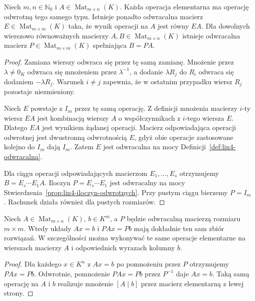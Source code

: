 \begin{stwierdzenie}
\label{prop:lin5-odwracalne-operacje}
Niech \(m,n\in\mathbb N_0\) i
\(A\in\operatorname{Mat}_{m\times n}(K)\).
Każda operacja elementarna ma operację odwrotną
tego samego typu. Istnieje ponadto
odwracalna macierz \(E\in\operatorname{Mat}_{m\times m}(K)\)
taka, że wynik operacji na \(A\) jest równy \(EA\).
Dla dowolnych wierszowo równoważnych macierzy
\(A,B\in\operatorname{Mat}_{m\times n}(K)\)
istnieje odwracalna macierz
\(P\in\operatorname{Mat}_{m\times m}(K)\)
spełniająca \(B=PA\).
\end{stwierdzenie}
\begin{proof}
Zamiana wierszy odwraca się przez tę samą zamianę.
Mnożenie przez \(\lambda\ne0_K\) odwraca się
mnożeniem przez \(\lambda^{-1}\), a dodanie
\(\lambda R_j\) do \(R_i\) odwraca się dodaniem
\(-\lambda R_j\). Warunek \(i\ne j\) zapewnia,
że w ostatnim przypadku wiersz \(R_j\)
pozostaje niezmieniony.

Niech \(E\) powstaje z \(I_m\) przez tę
samą operację. Z definicji mnożenia macierzy
\(i\)-ty wiersz \(EA\) jest kombinacją wierszy
\(A\) o współczynnikach z \(i\)-tego wiersza \(E\).
Dlatego \(EA\) jest wynikiem żądanej operacji.
Macierz odpowiadająca operacji odwrotnej
jest dwustronną odwrotnością \(E\), gdyż
obie operacje zastosowane kolejno do \(I_m\)
dają \(I_m\). Zatem \(E\) jest odwracalna
na mocy Definicji~\ref{def:lin4-odwracalna}.

Dla ciągu operacji odpowiadających macierzom
\(E_1,\ldots,E_s\) otrzymujemy
\(B=E_s\cdots E_1 A\).
Iloczyn \(P=E_s\cdots E_1\) jest odwracalny
na mocy Stwierdzenia~\ref{prop:lin4-iloczyn-odwrotnych}.
Przy pustym ciągu bierzemy \(P=I_m\).
Rachunek działa również dla pustych rozmiarów.
\end{proof}

\begin{wniosek}
\label{cor:lin5-rownowazne-uklady}
Niech \(A\in\operatorname{Mat}_{m\times n}(K)\),
\(b\in K^m\), a \(P\) będzie odwracalną
macierzą rozmiaru \(m\times m\).
Wtedy układy \(Ax=b\) i \(PAx=Pb\)
mają dokładnie ten sam zbiór rozwiązań.
W szczególności można wykonywać te same
operacje elementarne na wierszach macierzy
\(A\) i odpowiednich wyrazach kolumny \(b\).
\end{wniosek}
\begin{proof}
Dla każdego \(x\in K^n\) z \(Ax=b\)
po pomnożeniu przez \(P\) otrzymujemy
\(PAx=Pb\). Odwrotnie, pomnożenie
\(PAx=Pb\) przez \(P^{-1}\) daje \(Ax=b\).
Taką samą operację na \(A\) i \(b\)
realizuje mnożenie \([A\mid b]\) przez
macierz elementarną z lewej strony.
\end{proof}

